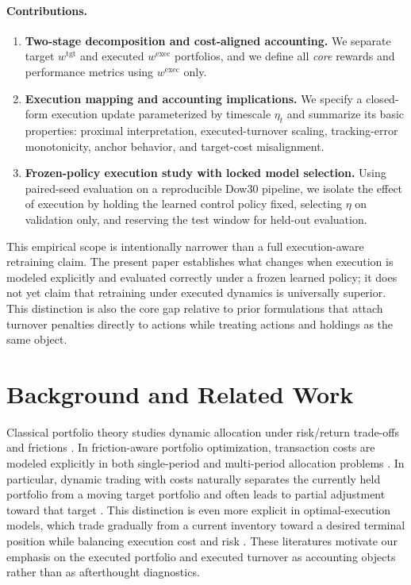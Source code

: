 \documentclass[10pt,twocolumn]{article}
\newcommand{\wexec}{w^{\mathrm{exec}}}
\newcommand{\wtgt}{w^{\mathrm{tgt}}}
\begin{document}
\paragraph{Contributions.}
\begin{enumerate}[leftmargin=*,itemsep=2pt]
\item \textbf{Two-stage decomposition and cost-aligned accounting.} We separate target $\wtgt$ and executed $\wexec$ portfolios, and we define all \emph{core} rewards and performance metrics using $\wexec$ only.
\item \textbf{Execution mapping and accounting implications.} We specify a closed-form execution update parameterized by timescale $\eta_t$ and summarize its basic properties: proximal interpretation, executed-turnover scaling, tracking-error monotonicity, anchor behavior, and target-cost misalignment.
\item \textbf{Frozen-policy execution study with locked model selection.} Using paired-seed evaluation on a reproducible Dow30 pipeline, we isolate the effect of execution by holding the learned control policy fixed, selecting $\eta$ on validation only, and reserving the test window for held-out evaluation.
\end{enumerate}
This empirical scope is intentionally narrower than a full execution-aware retraining claim. The present paper establishes what changes when execution is modeled explicitly and evaluated correctly under a frozen learned policy; it does not yet claim that retraining under executed dynamics is universally superior. This distinction is also the core gap relative to prior formulations that attach turnover penalties directly to actions while treating actions and holdings as the same object.

\section{Background and Related Work}
Classical portfolio theory studies dynamic allocation under risk/return trade-offs and frictions \cite{markowitz1952,merton1973}. In friction-aware portfolio optimization, transaction costs are modeled explicitly in both single-period and multi-period allocation problems \cite{lobo2007,garleanu2013}. In particular, dynamic trading with costs naturally separates the currently held portfolio from a moving target portfolio and often leads to partial adjustment toward that target \cite{garleanu2013}. This distinction is even more explicit in optimal-execution models, which trade gradually from a current inventory toward a desired terminal position while balancing execution cost and risk \cite{almgren2000}. These literatures motivate our emphasis on the executed portfolio and executed turnover as accounting objects rather than as afterthought diagnostics.
\end{document}
